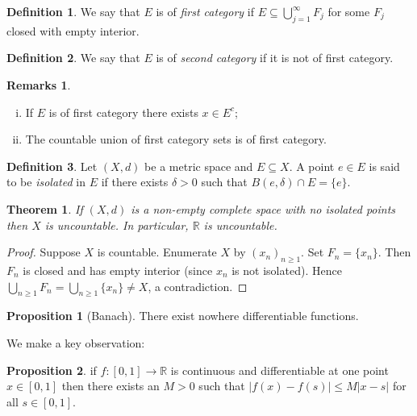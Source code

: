 \documentclass[a4paper, 10pt, twocolumn]{amsart}
\newtheorem*{theorem}{Theorem}
\theoremstyle{definition}
\newtheorem*{definition}{Definition}
\newtheorem*{proposition}{Proposition}
\newtheorem*{remarks}{Remarks}
\newcommand{\bb}[1]{\mathbb{#1}}
\newcommand{\sbs}[0]{\subseteq}
\newcommand{\1}{\mathbbm{1}}
\begin{document}
\begin{definition}
    We say that $E$ is of \textit{first category} if $E \sbs \bigcup_{j=1}^\infty F_j$ for some $F_j$ closed with empty interior.
\end{definition}

\begin{definition}
    We say that $E$ is of \textit{second category} if it is not of first category. 
\end{definition}

\begin{remarks}
    \ \begin{enumerate}[(i)]
        \item If $E$ is of first category there exists $x \in E^c$;
        \item The countable union of first category sets is of first category.
    \end{enumerate}
\end{remarks}

\begin{definition}
    Let $(X,d)$ be a metric space and $E \sbs X$. A point $e \in E$ is said to be \textit{isolated} in $E$ if there exists $\delta>0$ such that $B(e,\delta) \cap E = \{e\}$. 
\end{definition}

\begin{theorem}
    If $(X,d)$ is a non-empty complete space with no isolated points then $X$ is uncountable. In particular, $\bb{R}$ is uncountable. 
\end{theorem}

\begin{proof}
    Suppose $X$ is countable. Enumerate $X$ by $(x_n)_{n\ge 1}$. Set $F_n = \{x_n\}$. Then $F_n$ is closed and has empty interior (since $x_n$ is not isolated). Hence $\bigcup_{n\ge 1} F_n = \bigcup_{n\ge 1} \{x_n\} \ne X$, a contradiction.
\end{proof}

\begin{proposition}[Banach]
    There exist nowhere differentiable functions. 
\end{proposition}

We make a key observation: 

\begin{proposition}
    if $f: [0,1] \to \bb{R}$ is continuous and differentiable at one point $x \in [0,1]$ then there exists an $M>0$ such that $|f(x)-f(s)| \le M|x-s|$ for all $s \in [0,1]$. 
\end{proposition}
\end{document}

